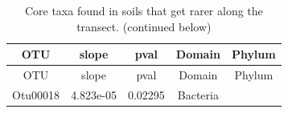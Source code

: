 \documentclass[]{article}
\begin{document}
\begin{longtable}[]{@{}ccccc@{}}
\caption{Core taxa found in soils that get rarer along the transect.
(continued below)}\tabularnewline
\toprule
\begin{minipage}[b]{0.13\columnwidth}\centering\strut
OTU\strut
\end{minipage} & \begin{minipage}[b]{0.14\columnwidth}\centering\strut
slope\strut
\end{minipage} & \begin{minipage}[b]{0.12\columnwidth}\centering\strut
pval\strut
\end{minipage} & \begin{minipage}[b]{0.13\columnwidth}\centering\strut
Domain\strut
\end{minipage} & \begin{minipage}[b]{0.19\columnwidth}\centering\strut
Phylum\strut
\end{minipage}\tabularnewline
\midrule
\endfirsthead
\toprule
\begin{minipage}[b]{0.13\columnwidth}\centering\strut
OTU\strut
\end{minipage} & \begin{minipage}[b]{0.14\columnwidth}\centering\strut
slope\strut
\end{minipage} & \begin{minipage}[b]{0.12\columnwidth}\centering\strut
pval\strut
\end{minipage} & \begin{minipage}[b]{0.13\columnwidth}\centering\strut
Domain\strut
\end{minipage} & \begin{minipage}[b]{0.19\columnwidth}\centering\strut
Phylum\strut
\end{minipage}\tabularnewline
\midrule
\endhead
\begin{minipage}[t]{0.13\columnwidth}\centering\strut
Otu00018\strut
\end{minipage} & \begin{minipage}[t]{0.14\columnwidth}\centering\strut
4.823e-05\strut
\end{minipage} & \begin{minipage}[t]{0.12\columnwidth}\centering\strut
0.02295\strut
\end{minipage} & \begin{minipage}[t]{0.13\columnwidth}\centering\strut
Bacteria\strut
\end{minipage} & \begin{minipage}[t]{0.19\columnwidth}\centering\strut

\end{minipage}
\end{longtable}
\end{document}
